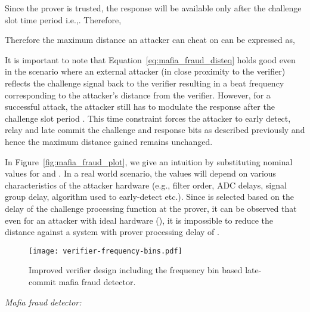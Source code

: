 \documentclass{sig-alternate-10pt}
\makeatletter
\newcommand{\eg}{e.g.,\xspace}
\newcommand{\etc}{etc.\@\xspace}
\newcommand{\ie}{i.e.,\xspace}
\makeatother
\begin{document}
Since the prover is trusted, the response will be available only after the
challenge slot time period \ie . Therefore,



Therefore the maximum distance an attacker can cheat on can be expressed as,



It is important to note that Equation~\eqref{eq:mafia_fraud_disteq} holds good
even in the scenario where an external attacker (in close proximity to the
verifier) reflects the challenge signal back to the verifier resulting in a beat
frequency corresponding to the attacker's distance from the verifier. However,
for a successful attack, the attacker still has to modulate the response after
the challenge slot period . This time constraint forces the attacker to
early detect, relay and late commit the challenge and response bits as described
previously and hence the maximum distance gained remains unchanged.

In Figure~\ref{fig:mafia_fraud_plot}, we give an intuition by substituting
nominal values for  and . In a real world scenario, the values
will depend on various characteristics of the attacker hardware (\eg filter
order, ADC delays, signal group delay, algorithm used to early-detect \etc).
Since  is selected based on the delay of the challenge processing
function at the prover, it can be observed that even for an attacker with
ideal hardware (), it is impossible to reduce the distance
against a system with prover processing delay of . 

\begin{figure}[t]
  \centering
  \texttt{[image: verifier-frequency-bins.pdf]}
  \caption{Improved verifier design including the frequency bin based
    late-commit mafia fraud detector.}
  \label{fig:verifier-bins}
\end{figure}


\emph{Mafia fraud detector:}
\end{document}
